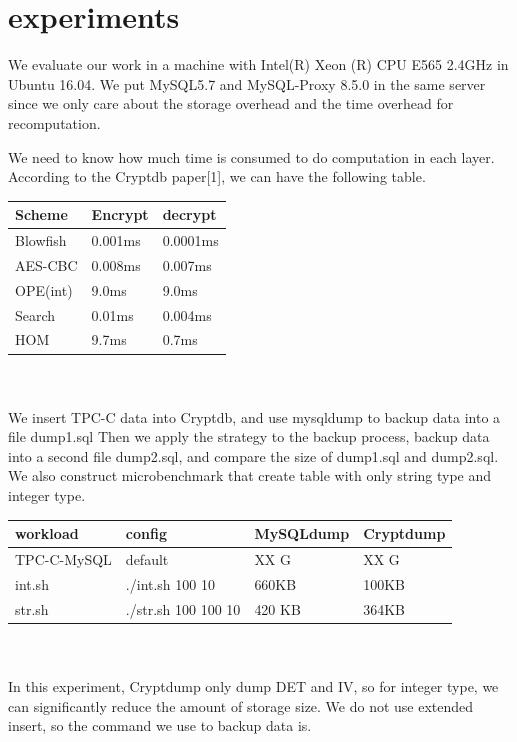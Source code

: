 \section{experiments}

We evaluate our work in a machine with Intel(R) Xeon (R) CPU E565 2.4GHz in Ubuntu 16.04. We put MySQL5.7 and MySQL-Proxy 8.5.0 in the same server since we only care about the storage overhead and the time overhead for recomputation.


We need to know how much time is consumed to do computation in each layer.
According to the Cryptdb paper[1], we can have the following table. 


\begin{tabular}{ | l | l | l|}
\hline Scheme & Encrypt & decrypt
\\ \hline Blowfish & 0.001ms & 0.0001ms
\\ \hline AES-CBC & 0.008ms & 0.007ms
\\ \hline OPE(int) & 9.0ms & 9.0ms
\\ \hline Search & 0.01ms & 0.004ms
\\ \hline HOM & 9.7ms & 0.7ms
\\ \hline \end{tabular}
\\ \\



We insert TPC-C data into Cryptdb, and use mysqldump to backup data into a file dump1.sql Then we apply the strategy to the backup process, backup data into a second file dump2.sql, and compare the size of dump1.sql and dump2.sql. We also construct microbenchmark that create table with only string type and integer type.


\begin{tabular}{ | l | l | l|l|}
\hline workload &config& MySQLdump & Cryptdump
\\ \hline TPC-C-MySQL &default& XX G & XX G
\\ \hline int.sh &./int.sh 100 10 & 660KB & 100KB
\\ \hline str.sh &./str.sh 100 100 10 & 420 KB& 364KB
\\ \hline \end{tabular}
\\ \\

In this experiment, Cryptdump only dump DET and IV, so for integer type, we can significantly reduce the amount of storage size. We do not use extended insert, so the command we use to backup data is.

